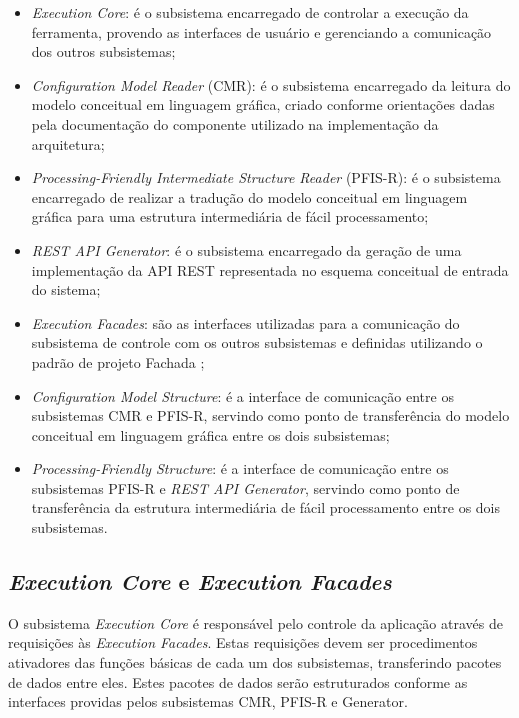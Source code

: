 \begin{itemize}
    \item \textit{Execution Core}: é o subsistema encarregado de controlar a execução da ferramenta, provendo as interfaces de usuário e gerenciando a comunicação dos outros subsistemas;
    \item \textit{Configuration Model Reader} (CMR): é o subsistema encarregado da leitura do modelo conceitual em linguagem gráfica, criado conforme orientações dadas pela documentação do componente utilizado na implementação da arquitetura;
    \item \textit{Processing-Friendly Intermediate Structure Reader} (PFIS-R): é o subsistema encarregado de realizar a tradução do modelo conceitual em linguagem gráfica para uma estrutura intermediária de fácil processamento;
    \item \textit{REST API Generator}: é o subsistema encarregado da geração de uma implementação da API REST representada no esquema conceitual de entrada do sistema;
    \item \textit{Execution Facades}: são as interfaces utilizadas para a comunicação do subsistema de controle com os outros subsistemas e definidas utilizando o padrão de projeto Fachada \cite{GAMMA:1995};
    \item \textit{Configuration Model Structure}: é a interface de comunicação entre os subsistemas CMR e PFIS-R, servindo como ponto de transferência do modelo conceitual em linguagem gráfica entre os dois subsistemas;
    \item \textit{Processing-Friendly Structure}: é a interface de comunicação entre os subsistemas PFIS-R e \textit{REST API Generator}, servindo como ponto de transferência da estrutura intermediária de fácil processamento entre os dois subsistemas.
\end{itemize}


\subsection{\textit{Execution Core} e \textit{Execution Facades}}

O subsistema \textit{Execution Core} é responsável pelo controle da aplicação através de requisições às \textit{Execution Facades}. Estas requisições devem ser procedimentos ativadores das funções básicas de cada um dos subsistemas, transferindo pacotes de dados entre eles. Estes pacotes de dados serão estruturados conforme as interfaces providas pelos subsistemas CMR, PFIS-R e Generator.

